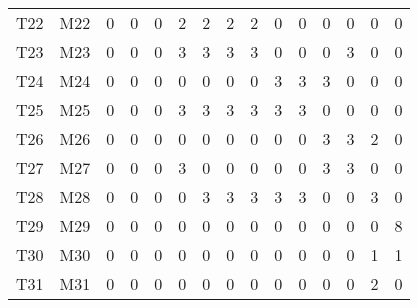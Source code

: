 \begin{table}[h]
\begin{tabular}{rrrrrrrrrrrrrrr}
		T22 & M22 & 0 & 0 & 0 & 2 & 2 & 2 & 2 & 0 & 0 & 0 & 0 & 0 & 0 \\
		T23 & M23 & 0 & 0 & 0 & 3 & 3 & 3 & 3 & 0 & 0 & 0 & 3 & 0 & 0 \\
		T24 & M24 & 0 & 0 & 0 & 0 & 0 & 0 & 0 & 3 & 3 & 3 & 0 & 0 & 0 \\
		T25 & M25 & 0 & 0 & 0 & 3 & 3 & 3 & 3 & 3 & 3 & 0 & 0 & 0 & 0 \\
		T26 & M26 & 0 & 0 & 0 & 0 & 0 & 0 & 0 & 0 & 0 & 3 & 3 & 2 & 0 \\
		T27 & M27 & 0 & 0 & 0 & 3 & 0 & 0 & 0 & 0 & 0 & 3 & 3 & 0 & 0 \\
		T28 & M28 & 0 & 0 & 0 & 0 & 3 & 3 & 3 & 3 & 3 & 0 & 0 & 3 & 0 \\
		T29 & M29 & 0 & 0 & 0 & 0 & 0 & 0 & 0 & 0 & 0 & 0 & 0 & 0 & 8 \\
		T30 & M30 & 0 & 0 & 0 & 0 & 0 & 0 & 0 & 0 & 0 & 0 & 0 & 1 & 1 \\
		T31 & M31 & 0 & 0 & 0 & 0 & 0 & 0 & 0 & 0 & 0 & 0 & 0 & 2 & 0 \\
		\bottomrule
	\end{tabular}
\end{table}
